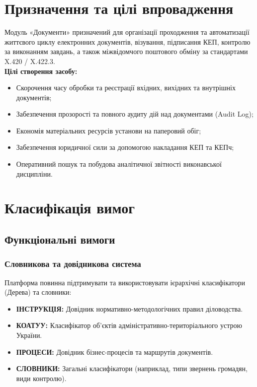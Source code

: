 \documentclass{article}
\begin{document}
\section{Призначення та цілі впровадження}
Модуль «Документи» призначений для організації проходження та автоматизації життєвого циклу електронних документів, візування, підписання КЕП, контролю за виконанням завдань, а також міжвідомчого поштового обміну за стандартами X.420 / X.422.3.
\\
\textbf{Цілі створення засобу:}
\begin{itemize}
    \item Скорочення часу обробки та реєстрації вхідних, вихідних та внутрішніх документів;
    \item Забезпечення прозорості та повного аудиту дій над документами (Audit Log);
    \item Економія матеріальних ресурсів установи на паперовий обіг;
    \item Забезпечення юридичної сили за допомогою накладання КЕП та КЕПч;
    \item Оперативний пошук та побудова аналітичної звітності виконавської дисципліни.
\end{itemize}

\section{Класифікація вимог}

\subsection{Функціональні вимоги}

\subsubsection{Словникова та довідникова система}
Платформа повинна підтримувати та використовувати ієрархічні класифікатори (Дерева) та словники:
\begin{itemize}
    \item \textbf{ІНСТРУКЦІЯ:} Довідник нормативно-методологічних правил діловодства.
    \item \textbf{КОАТУУ:} Класифікатор об'єктів адміністративно-територіального устрою України.
    \item \textbf{ПРОЦЕСИ:} Довідник бізнес-процесів та маршрутів документів.
    \item \textbf{СЛОВНИКИ:} Загальні класифікатори (наприклад, типи звернень громадян, види контролю).
\end{itemize}
\end{document}
